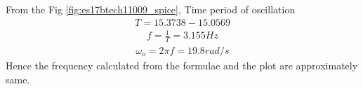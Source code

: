 \begin{enumerate}[label=\arabic*.,ref=\theenumi]
\begin{figure}[!ht]
\caption{}
\label{fig:es17btech11009_spice1}
\end{figure}
From the Fig \ref{fig:es17btech11009_spice},
Time period of oscillation 
\begin{align}
    T = 15.3738 - 15.0569
\end{align}
\begin{align}
    f = \frac{1}{T} = 3.155 Hz
\end{align}
\begin{align}
    \omega_{o} = 2\pi f = 19.8 rad/s
\end{align}
Hence the frequency calculated from the formulae and the plot are approximately same.
\end{enumerate}
